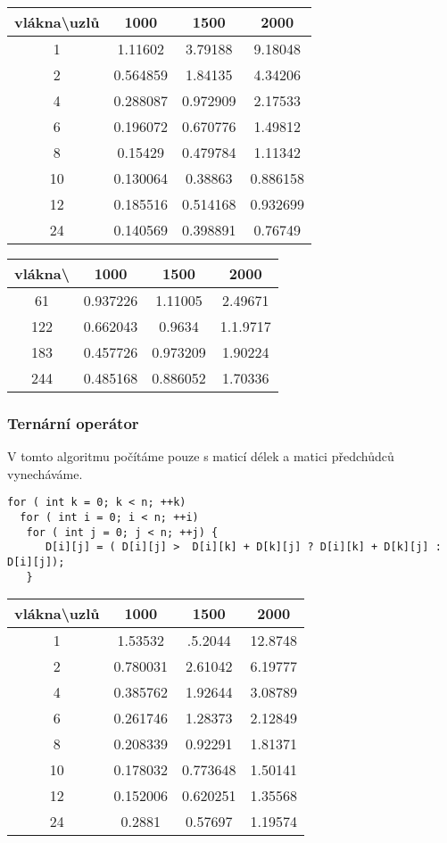 \documentclass[a4paper,11pt]{article}
\begin{document}
\begin{tabular}{|c|c|c|c|}
	\hline vlákna\textbackslash  uzlů & 1000 & 1500 & 2000 \\ 
	\hline 1 & 1.11602 & 3.79188 & 9.18048 \\ 
	\hline 2 & 0.564859 & 1.84135 & 4.34206 \\ 
	\hline 4 & 0.288087 & 0.972909 & 2.17533 \\ 
	\hline 6 & 0.196072 & 0.670776 & 1.49812 \\ 
	\hline 8 & 0.15429 & 0.479784 & 1.11342 \\ 
	\hline 10 & 0.130064 & 0.38863 & 0.886158 \\ 
	\hline 12 & 0.185516 & 0.514168 & 0.932699 \\ 
	\hline 24 & 0.140569 & 0.398891 & 0.76749 \\ 
	\hline 
\end{tabular} 

\begin{tabular}{|c|c|c|c|}
	\hline vlákna\textbackslash & 1000 & 1500 & 2000 \\ 
	\hline 61 & 0.937226 & 1.11005 & 2.49671 \\ 
	\hline 122 & 0.662043 & 0.9634 & 1.1.9717 \\ 
	\hline 183 & 0.457726 & 0.973209 & 1.90224 \\ 
	\hline 244 & 0.485168 & 0.886052 & 1.70336 \\ 
	\hline 
\end{tabular} 

\subsubsection{Ternární operátor}
V tomto algoritmu počítáme pouze s maticí délek a matici předchůdců vynecháváme. 
\lstset {language=C++}
\begin{lstlisting}
for ( int k = 0; k < n; ++k)
  for ( int i = 0; i < n; ++i) 
   for ( int j = 0; j < n; ++j) {
      D[i][j] = ( D[i][j] >  D[i][k] + D[k][j] ? D[i][k] + D[k][j] : D[i][j]);
   }
\end{lstlisting}

\begin{tabular}{|c|c|c|c|}
	\hline vlákna\textbackslash  uzlů  & 1000 & 1500 & 2000 \\ 
	\hline 1 & 1.53532 & .5.2044 & 12.8748 \\ 
	\hline 2 & 0.780031 & 2.61042 & 6.19777 \\ 
	\hline 4 & 0.385762 & 1.92644 & 3.08789 \\ 
	\hline 6 & 0.261746 & 1.28373 & 2.12849 \\ 
	\hline 8 & 0.208339 & 0.92291 & 1.81371 \\ 
	\hline 10 & 0.178032 & 0.773648 & 1.50141 \\ 
	\hline 12 & 0.152006 & 0.620251 & 1.35568 \\ 
	\hline 24 & 0.2881 & 0.57697 & 1.19574 \\ 
	\hline 
\end{tabular} 
\end{document}
